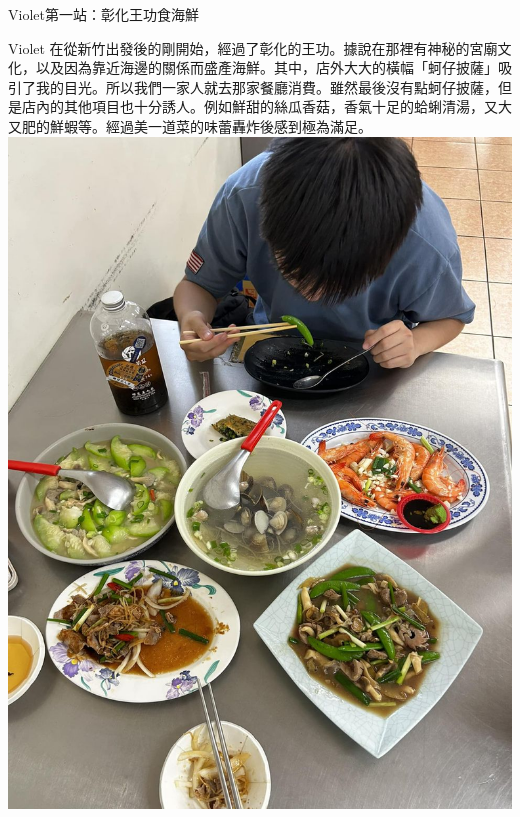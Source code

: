 \documentclass{article}
\begin{document}

\begin{large}
\begin{boxpar}{Violet}{第一站：彰化王功食海鮮}
  \begin{sblock}{Violet}
    在從新竹出發後的剛開始，經過了彰化的王功。據說在那裡有神秘的宮廟文化，以及因為靠近海邊的關係而盛產海鮮。其中，店外大大的橫幅「蚵仔披薩」吸引了我的目光。所以我們一家人就去那家餐廳消費。雖然最後沒有點蚵仔披薩，但是店內的其他項目也十分誘人。例如鮮甜的絲瓜香菇，香氣十足的蛤蜊清湯，又大又肥的鮮蝦等。經過美一道菜的味蕾轟炸後感到極為滿足。
    \tcblower
    \centering
    \includegraphics[width=\linewidth]{seafood.jpg}
  \end{sblock}


\end{boxpar}
\end{large}
\end{document}

